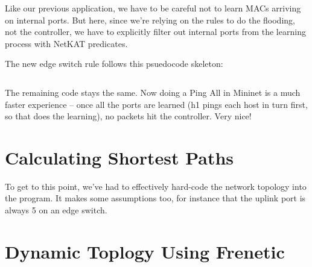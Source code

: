 Like our previous application, we have to be careful not to learn MACs arriving on internal ports.
But here, since we're relying on the rules to do the flooding, not the controller, we have to 
explicitly filter out internal ports from the learning process with NetKAT predicates.

The new edge switch rule follows this psuedocode skeleton:

\inputminted[firstline=34,lastline=54]{python}{code/multiswitch_topologies/multiswitch2.py}

The remaining code stays the same.  Now doing a Ping All in Mininet is a much faster experience -- once all the
ports are learned (h1 pings each host in turn first, so that does the learning), no packets hit the controller.
Very nice!

\section{Calculating Shortest Paths}

To get to this point, we've had to effectively hard-code the network topology into the program.  It makes 
some assumptions too, for instance that the uplink port is always 5 on an edge switch.  



\section{Dynamic Toplogy Using Frenetic}


